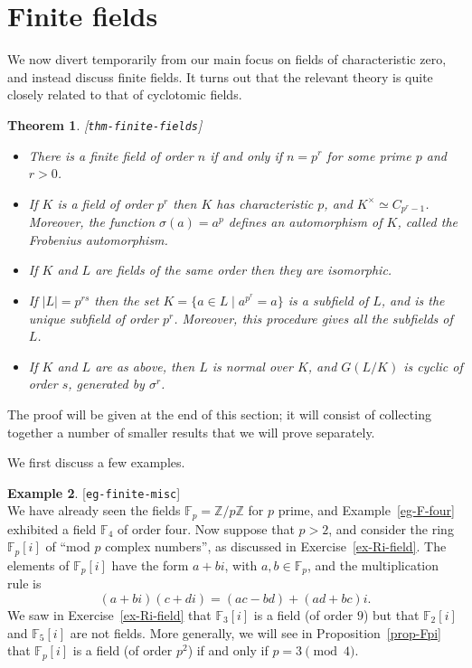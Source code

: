 \documentclass{amsart}
\newcommand{\lbl}[1]{\label{#1}\textup{[\texttt{#1}]}\ \\}
\newcommand{\lbl}{\label}
\newcommand{\Z}         {{\mathbb{Z}}}
\newcommand{\F}         {{\mathbb{F}}}
\newcommand{\sg}        {\sigma}
\newcommand{\st}        {\;|\;}
\newcommand{\tm}        {\times}
\renewcommand{\:}{\colon}
\newtheorem{theorem}{Theorem}[section]
\theoremstyle{definition}
\newtheorem{example}[theorem]{Example}
\begin{document}
\section{Finite fields}
\label{sec-finite-fields}

We now divert temporarily from our main focus on fields of
characteristic zero, and instead discuss finite fields.  It turns out
that the relevant theory is quite closely related to that of
cyclotomic fields.

\begin{theorem}\lbl{thm-finite-fields}
 \begin{itemize}
  \item[(a)] There is a finite field of order $n$ if and only if
   $n=p^r$ for some prime $p$ and $r>0$.
  \item[(b)] If $K$ is a field of order $p^r$ then $K$ has
   characteristic $p$, and $K^\tm\simeq C_{p^r-1}$.  Moreover, the
   function $\sg(a)=a^p$ defines an automorphism of $K$, called the
   \emph{Frobenius automorphism}.
  \item[(c)] If $K$ and $L$ are fields of the same order then they are
   isomorphic.  
  \item[(d)] If $|L|=p^{rs}$ then the set $K=\{a\in L\st a^{p^r}=a\}$
   is a subfield of $L$, and is the unique subfield of order $p^r$.
   Moreover, this procedure gives all the subfields of $L$.
  \item[(e)] If $K$ and $L$ are as above, then $L$ is normal over $K$,
   and $G(L/K)$ is cyclic of order $s$, generated by $\sg^r$.
 \end{itemize}
\end{theorem}

The proof will be given at the end of this section; it will consist of
collecting together a number of smaller results that we will prove
separately. 

We first discuss a few examples.
\begin{example}\lbl{eg-finite-misc}
 We have already seen the fields $\F_p=\Z/p\Z$ for $p$ prime, and
 Example~\ref{eg-F-four} exhibited a field $\F_4$ of order four.  Now
 suppose that $p>2$, and consider the ring $\F_p[i]$ of ``mod $p$
 complex numbers'', as discussed in Exercise~\ref{ex-Ri-field}.  The
 elements of $\F_p[i]$ have the form $a+bi$, with $a,b\in\F_p$, and
 the multiplication rule is
 \[ (a+bi)(c+di) = (ac-bd)+(ad+bc)i. \]
 We saw in Exercise~\ref{ex-Ri-field} that $\F_3[i]$ is a field (of
 order $9$) but that $\F_2[i]$ and $\F_5[i]$ are not fields.  More
 generally, we will see in Proposition~\ref{prop-Fpi} that $\F_p[i]$ is
 a field (of order $p^2$) if and only if $p=3\pmod{4}$.
\end{example}
\end{document}
